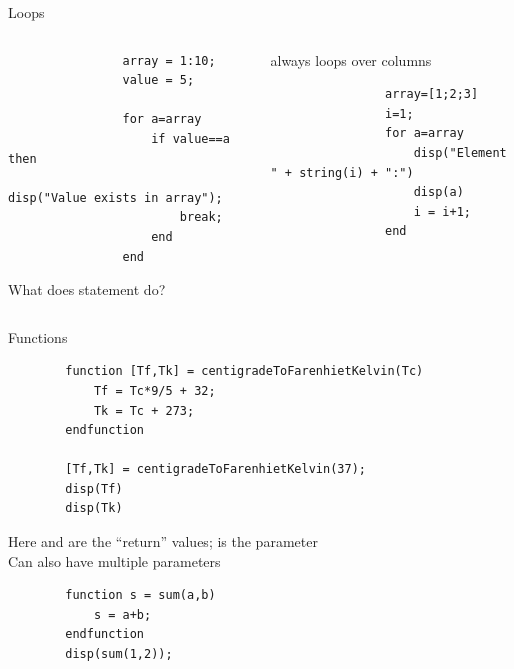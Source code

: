 \begin{frame}[fragile]{Loops}
    \begin{columns}
        \begin{column}{0.5\linewidth}
            \begin{lstlisting}
                array = 1:10;
                value = 5;
                
                for a=array
                    if value==a then
                        disp("Value exists in array");
                        break;
                    end
                end
            \end{lstlisting}
            What does  statement do?
        \end{column}
        \begin{column}{0.49\linewidth}
            \scilab{} always loops over columns
            \begin{lstlisting}
                array=[1;2;3]
                i=1;
                for a=array
                    disp("Element " + string(i) + ":")
                    disp(a)
                    i = i+1;
                end
            \end{lstlisting}
        \end{column}
    \end{columns}
\end{frame}

\begin{frame}[fragile]{Functions}
    \begin{lstlisting}
        function [Tf,Tk] = centigradeToFarenhietKelvin(Tc)
            Tf = Tc*9/5 + 32;
            Tk = Tc + 273;
        endfunction
        
        [Tf,Tk] = centigradeToFarenhietKelvin(37);
        disp(Tf)
        disp(Tk)
    \end{lstlisting}
    Here  and  are the ``return'' values;  is the parameter\\[0.5em]
    Can also have multiple parameters
    \begin{lstlisting}
        function s = sum(a,b)
            s = a+b;
        endfunction
        disp(sum(1,2));
    \end{lstlisting}
\end{frame}


